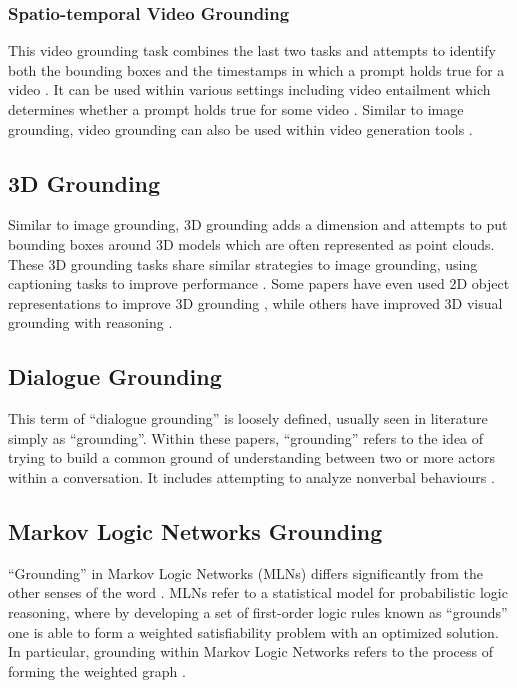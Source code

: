 \documentclass[11pt]{article}
\begin{document}
\subsubsection{Spatio-temporal Video Grounding}
This video grounding task combines the last two tasks and attempts to identify both the bounding boxes and the timestamps in which a prompt holds true for a video \cite{Wasim_2024_CVPR_DINO,Chen_2024_CVPR_self_supervised_spatio_temporal,jin2022embracingconsistencyonestageapproach}. It can be used within various settings including video entailment which determines whether a prompt holds true for some video \cite{Chen_2021_ICCV_video_entailment}. Similar to image grounding, video grounding can also be used within video generation tools \cite{jeong2024groundavideozeroshotgroundedvideo}.

\subsection{3D Grounding}
Similar to image grounding, 3D grounding adds a dimension and attempts to put bounding boxes around 3D models which are often represented as point clouds. These 3D grounding tasks share similar strategies to image grounding, using captioning tasks to improve performance \cite{Cai_2022_CVPR_3DJCG,NEURIPS2023_exploiting_context_3d, NEURIPS2023_city_refer_3d,wang20233drpnet3drelativepositionaware}. Some papers have even used 2D object representations to improve 3D grounding \cite{Yang_2021_ICCV_sat_2d}, while others have improved 3D visual grounding with reasoning \cite{zhu2024scanreasonempowering3dvisual}.

\subsection{Dialogue Grounding}
This term of ``dialogue grounding'' is loosely defined, usually seen in literature simply as ``grounding''. Within these papers, ``grounding'' refers to the idea of trying to build a common ground of understanding between two or more actors within a conversation. It includes attempting to analyze nonverbal behaviours \cite{nakano-etal-2003-towards,Roque2007ReactingTA_dialogue, liu-etal-2012-towards,shaikh2024groundinggapslanguagemodel}.

\subsection{Markov Logic Networks Grounding}
``Grounding'' in Markov Logic Networks (MLNs) differs significantly from the other senses of the word \cite{NIPS2014_markov_logic_networks}. MLNs refer to a statistical model for probabilistic logic reasoning, where by developing a set of first-order logic rules known as ``grounds'' one is able to form a weighted satisfiability problem with an optimized solution. In particular, grounding within Markov Logic Networks refers to the process of forming the weighted graph \cite{MLN4KB_markov}.
\end{document}
